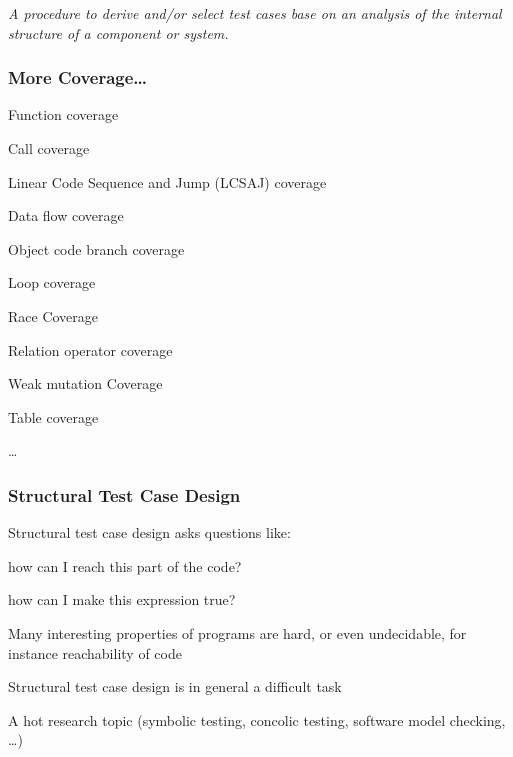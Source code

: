 \textit{A procedure to derive and/or select test cases base on an analysis of the internal structure of a component or system.}

\subsubsection{More Coverage\ldots}

\begin{itemize*}
	\item Function coverage
	\item Call coverage
	\item Linear Code Sequence and Jump (LCSAJ) coverage
	\item Data flow coverage
	\item Object code branch coverage
	\item Loop coverage
	\item Race Coverage
	\item Relation operator coverage
	\item Weak mutation Coverage
	\item Table coverage
	\item \ldots
\end{itemize*}

\subsubsection{Structural Test Case Design}

\begin{itemize*}
	\item Structural test case design asks questions like:
	\begin{itemize*}
		\item how can I reach this part of the code?
		\item how can I make this expression true?
	\end{itemize*}
	\item Many interesting properties of programs are hard, or even
	undecidable, for instance reachability of code
	\item Structural test case design is in general a difficult task
	\item A hot research topic (symbolic testing, concolic testing, software model checking, \ldots)
\end{itemize*}
